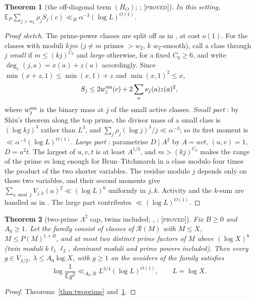 \documentclass[10pt,reqno]{amsart}
\newtheorem{theorem}{Theorem}[section]
\theoremstyle{definition}
\theoremstyle{remark}
\newcommand{\cR}{\mathscr R}
\newcommand{\E}{\mathbb E}
\newcommand{\lab}[1]{\textup{[\textsc{#1}]}}
\begin{document}
\begin{theorem}[the off-diagonal term $(H_O)$; {\cite[Thm~4.1]{TW3}}; \lab{proved}]\label{thm:HO}
In this setting,
$\E_P\sum_{j>w_2}\rho_jS_j(c)\ll_B\alpha^{-3}(\log L)^{O(1)}$.
\end{theorem}
\begin{proof}[Proof sketch]
The prime-power classes are split off as in \cite[Lemma~5.4]{TW2}, at cost
$o(1)$.  For the classes with moduli $kjm$ ($j\neq m$ primes $>w_2$, $k$
$w_2$-smooth), call a class through $j$ \emph{small} if $m\leq(kj)^{C_0}$
and \emph{large} otherwise, for a fixed $C_0\geq6$, and write
$\deg_c(j,a)=x(a)+z(a)$ accordingly.  Since $\min(x+z,1)\leq\min(x,1)+z$ and
$\min(x,1)^2\leq x$,
\[
 S_j\leq2w_j^{\rm sm}(c)+2\sum_a\nu_j(a)z(a)^2,
\]
where $w_j^{\rm sm}$ is the binary mass at $j$ of the small active classes.
\emph{Small part} \cite[Lemma~2.1]{TW3}: by Shiu's theorem along the top
prime, the divisor mass of a small class is $(\log kj)^3$ rather than
$L^3$, and $\sum_j\rho_j(\log j)^3/j\ll\alpha^{-3}$; so its first moment is
$\ll\alpha^{-3}(\log L)^{O(1)}$.  \emph{Large part}
\cite[Lemmas~3.1--3.4]{TW3}: parametrise $D\mid A^2$ by $A=uvt$, $(u,v)=1$,
$D=u^2t$.  The largest of $u,v,t$ is at least $A^{1/3}$, and $m>(kj)^{C_0}$
makes the range of the prime $m$ long enough for Brun--Titchmarsh in a
class modulo four times the product of the two shorter variables.  The
residue modulo $j$ depends only on those two variables, and their second
moments give $\sum_{a\bmod j}V_{j,k}(a)^2\ll(\log L)^6$ uniformly in $j,k$.
Activity and the $k$-sum are handled as in \cite[Lemma~5.4]{TW2}.  The
large part contributes $\ll(\log L)^{O(1)}$.
\end{proof}

\begin{theorem}[two-prime $\Lambda^2$ cap, twins included; {\cite[Cor.~5.2]{TW2}}, {\cite[Cor.~4.2]{TW3}}; \lab{proved}]\label{thm:twoprimecap}
Fix $B\geq0$ and $A_0\geq1$.  Let the family consist of classes of
$\cR(M)$ with $M\leq X$, $M\leq P(M)^{1+B}$, and at most two distinct prime
factors of $M$ above $(\log X)^8$ (twin moduli $k\ell_1\ell_2$, dominant
moduli and prime powers included).  Then every $g\in V_{\lambda/2}$,
$\lambda\leq A_0\log X$, with $g\geq1$ on the avoiders of the family
satisfies
\[
 \log\frac1{\E g^2}\ll_{A_0,B}L^{3/4}(\log L)^{O(1)},\qquad L=\log X.
\]
\end{theorem}
\begin{proof}
Theorems~\ref{thm:twoprime} and~\ref{thm:HO}.
\end{proof}
\end{document}
